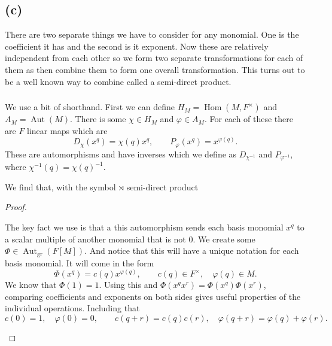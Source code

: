 \documentclass[11pt]{scrartcl}
\begin{document}
\subsection{(c)}

\begin{soln}

	There are two separate things we have to consider for any monomial. 
	One is the coefficient it has and the second is it exponent. Now 
	these are relatively independent from each other so we form two separate
	transformations for each of them as then combine them to form one overall 
	transformation. This turns out to be a well known way to combine called a
	semi-direct product. 

    \subsubsection*{}

    We use a bit of shorthand. 
	First we can define $H_M=\operatorname{Hom}(M,F^\times)$ and
    $A_M=\operatorname{Aut}(M)$.
    There is some 
	 $\chi\in H_M$ and $\varphi\in A_M$. For each 
	 of these there are $F$ linear maps which 
	 are 
    \[
    D_\chi(x^q)=\chi(q)x^q,
    \qquad
    P_\varphi(x^q)=x^{\varphi(q)}.
    \]
    These are automorphisms and have inverses which
	we define as $D_{\chi^{-1}}$ and
    $P_{\varphi^{-1}}$, where $\chi^{-1}(q)=\chi(q)^{-1}$.

    \begin{claim*}
        We find that, with the symbol $\rtimes$ semi-direct product 
    \end{claim*}

    \begin{proof}
        \begin{subproof}
            The key fact we use is that a this automorphism sends each basis
monomial $x^q$ to a scalar multiple of another monomial that is not $0$. We 
			create some 
            $\Phi\in\operatorname{Aut}_{\mathrm{gr}}(F[M])$. And notice that this will have a unique notation for each basis monomial. It will come in the form
            \[
            \Phi(x^q)=c(q)x^{\varphi(q)},
            \qquad c(q)\in F^\times,\quad\varphi(q)\in M.
            \]
            We know that $\Phi(1)=1$. Using this and $\Phi(x^qx^r)=\Phi(x^q)\Phi(x^r)$, comparing
coefficients and exponents on both sides gives useful properties of the individual operations. Including that
            \[
            c(0)=1,\quad\varphi(0)=0,\qquad
            c(q+r)=c(q)c(r),\quad
            \varphi(q+r)=\varphi(q)+\varphi(r).
            \]


\end{subproof}
\end{proof}
\end{soln}
\end{document}

